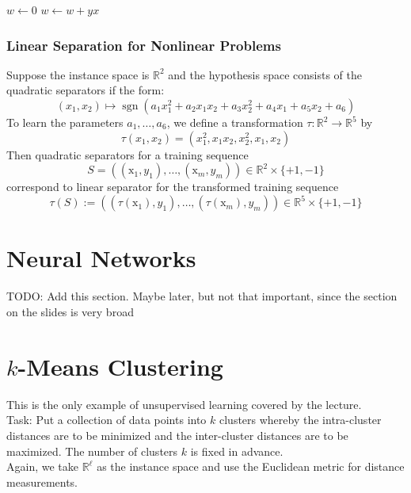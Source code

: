 \begin{algorithmic}
	\State $w\gets 0$
	\Repeat 
			\State $w \gets w + yx$
		\EndIf
		\EndFor
\end{algorithmic}
\subsubsection{Linear Separation for Nonlinear Problems}
Suppose the instance space is $\mathbb{R}^2$ and the hypothesis space consists of the quadratic separators if the form:
\begin{equation}
(x_1, x_2) \mapsto \operatorname{sgn}(a_1 x_1^2+a_2 x_1 x_2+a_3 x_2^2+a_4 x_1+a_5 x_2+a_6)
\end{equation}
To learn the parameters $a_1,\ldots,a_6$, we define a transformation $\tau :\mathbb{R}^2 \rightarrow \mathbb{R}^5$ by
\begin{equation}
\tau(x_1,x_2) = (x_1^2,x_1x_2,x_2^2,x_1,x_2)
\end{equation}
Then quadratic separators for a training sequence
\begin{equation}
S=((\mathrm{x}_{1}, y_{1}), \ldots,(\mathrm{x}_{m}, y_{m})) \in \mathbb{R}^{2} \times\{+1,-1\}
\end{equation}
correspond to linear separator for the transformed training sequence
\begin{equation}
\tau(S) :=((\tau(\mathrm{x}_{1}), y_{1}), \ldots,(\tau(\mathrm{x}_{m}), y_{m})) \in \mathbb{R}^{5} \times\{+1,-1\}
\end{equation}
\section{Neural Networks}
TODO: Add this section. Maybe later, but not that important, since the section on the slides is very broad
\section{$k$-Means Clustering}
This is the only example of unsupervised learning covered by the lecture.\\
Task: Put a collection of data points into $k$ clusters whereby the intra-cluster distances are to be minimized and the inter-cluster distances are to be maximized. The number of clusters $k$ is fixed in advance.\\
Again, we take $\mathbb{R}^\ell$ as the instance space and use the Euclidean metric for distance measurements.\\

